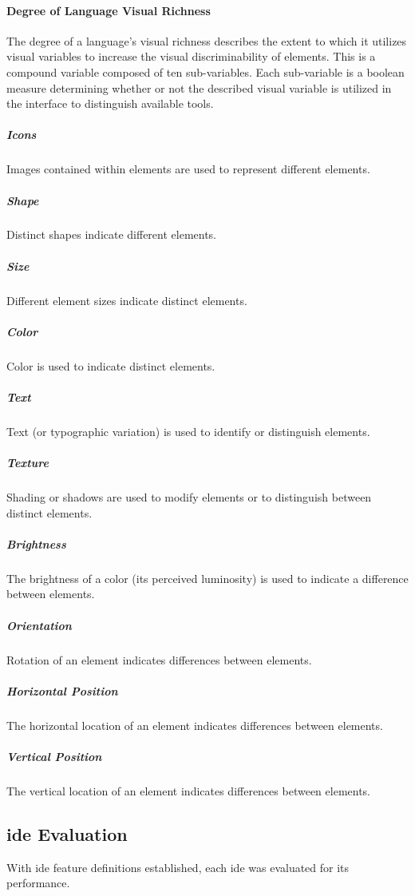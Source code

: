 \paragraph{Degree of Language Visual Richness} The degree of a language's
visual richness describes the extent to which it utilizes visual
variables to increase the visual discriminability of elements. This
is a compound variable composed of ten sub-variables. Each sub-variable
is a boolean measure determining whether or not the described visual
variable is utilized in the interface to distinguish available tools.

\subparagraph{Icons} Images contained within elements are used to represent
different elements.~\cite{costagliola2002,moody2009}

\subparagraph{Shape} Distinct shapes indicate different elements.
\cite{moody2009}

\subparagraph{Size} Different element sizes indicate distinct elements.
\cite{moody2009}

\subparagraph{Color} Color is used to indicate distinct elements.
\cite{moody2009}

\subparagraph{Text} Text (or typographic variation) is used to identify or
distinguish elements.~\cite{moody2009}

\subparagraph{Texture} Shading or shadows are used to modify elements or to
distinguish between distinct elements.~\cite{moody2009}

\subparagraph{Brightness} The brightness of a color (\ie its perceived
luminosity) is used to indicate a difference between elements.
\cite{moody2009}

\subparagraph{Orientation} Rotation of an element indicates differences
between elements.~\cite{moody2009}

\subparagraph{Horizontal Position} The horizontal location of an element
indicates differences between elements.~\cite{moody2009}

\subparagraph{Vertical Position} The vertical location of an element
indicates differences between elements.~\cite{moody2009}


\subsection{\acs{ide} Evaluation} \label{subsec:ideevaluation}

With \ac{ide} feature definitions established, each \ac{ide} was evaluated
for its performance. 
